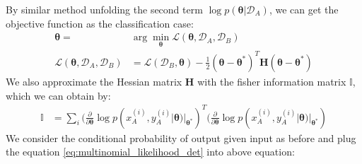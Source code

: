 \documentclass{article}
\begin{document}
By similar method unfolding the second term $\log p(\boldsymbol{\theta}| \mathcal D_A)$,
we can get the objective function as the classification case:
\begin{equation}
\begin{split}
\boldsymbol{\theta} = & \arg \min_{\boldsymbol{\theta}} \mathcal L(\boldsymbol{\theta}, \mathcal D_A, \mathcal D_B) \\
\mathcal L(\boldsymbol{\theta}, \mathcal D_A, \mathcal D_B)  &= \mathcal L(\mathcal D_B, \boldsymbol{\theta}) 
-\frac{1}{2}(\boldsymbol{\theta} - \boldsymbol{\theta^*})^T\boldsymbol{H} (\boldsymbol{\theta} - \boldsymbol{\theta^*})        
\end{split}
\end{equation}
We also approximate the Hessian matrix $\boldsymbol{H}$ with the fisher information matrix $\mathbb{I}$,
which we can obtain by:
\begin{equation}
\begin{split}
\mathbb{I} 
&= \sum_i (\frac{\partial}{\partial \boldsymbol{\theta}}
\log p(x_A^{(i)}, y_A^{(i)}|\boldsymbol{\theta})|_{\boldsymbol{\theta^*}})^T
(\frac{\partial}{\partial \boldsymbol{\theta}}
\log p(x_A^{(i)}, y_A^{(i)}|\boldsymbol{\theta})|_{\boldsymbol{\theta^*}})
\end{split}
\end{equation}
We consider the conditional probability of output given input
as before
and plug the equation \ref{eq:multinomial_likelihood_det} into above equation:
\end{document}
